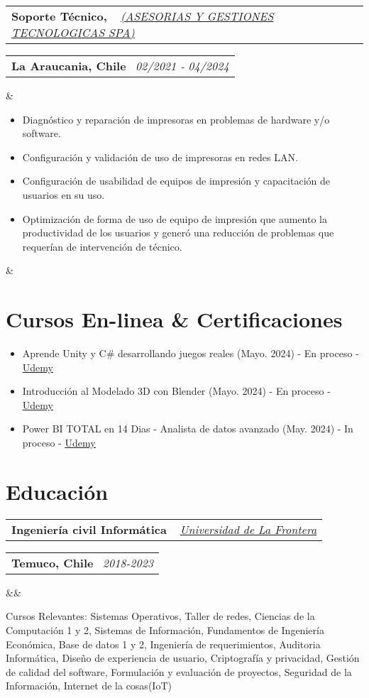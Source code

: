 \documentclass[11pt,a4paper,sans]{moderncv}
\makeatletter
\newcommand*{\customcventry}[7][.13em]{
    \begin{tabular}{@{}l}
    {\bfseries #4} \
    {\itshape #3}
    \end{tabular}
    \hfill
    \begin{tabular}{l@{}}
    {\bfseries #5} \
    {\itshape #2}
    \end{tabular}
    \ifx&#7&%
    \else{\
    \begin{minipage}{\maincolumnwidth}%
    \small#7%
    \end{minipage}}\fi%
    \par\addvspace{#1}
}
\makeatother
\begin{document}
\customcventry
    {02/2021 ‐ 04/2024}
    {{ \color{blue} \href{http://www.tisol.cl/}{(ASESORIAS Y GESTIONES TECNOLOGICAS SPA)} }}
    {Soporte Técnico,}
    {La Araucania, Chile}
    {}
    {{\begin{itemize}[leftmargin=0.6cm, label={\textbullet}]
        \item Diagnóstico y reparación de impresoras en problemas de hardware y/o software.
        \item Configuración y validación de uso de impresoras en redes LAN.
        \item Configuración de usabilidad de equipos de impresión y capacitación de usuarios en su uso.
        \item Optimización de forma de uso de equipo de impresión que aumento la productividad de los usuarios y generó una reducción de problemas que requerían de intervención de técnico.
    \end{itemize}
    }
}

\section{Cursos En-linea \& Certificaciones}{
    \begin{itemize}[label=\textbullet]
      
      \item Aprende Unity y C\# desarrollando juegos reales
      (Mayo. 2024) - En proceso - \underline{\color{blue}\href{https://www.udemy.com/}{Udemy}}
      \item Introducción al Modelado 3D con Blender
      (Mayo. 2024) - En proceso - \underline{\color{blue}\href{https://www.udemy.com/}{Udemy}}
      \item Power BI TOTAL en 14 Dias - Analista de datos avanzado
      (May. 2024) - In proceso - \underline{\color{blue}\href{https://www.udemy.com/}{Udemy}}
    \end{itemize}
} 

\section{Educación}
\customcventry
    {2018-2023}
    { \color{blue} \href{https://www.ufro.cl/}{Universidad de La Frontera} }{Ingeniería civil Informática}{Temuco, Chile}
    {}{}
    {Cursos Relevantes: 
        Sistemas Operativos, 
        Taller de redes, 
        Ciencias de la Computación 1 y 2, 
        Sistemas de Información, 
        Fundamentos de Ingeniería Económica, 
        Base de datos 1 y 2, 
        Ingeniería de requerimientos,
        Auditoria Informática, 
        Diseño de experiencia de usuario, 
        Criptografía y privacidad, 
        Gestión de calidad del software, 
        Formulación y evaluación de proyectos,
        Seguridad de la Información,
        Internet de la cosas(IoT)
}
    
\end{document}
